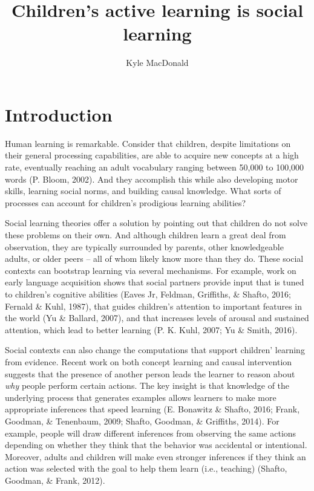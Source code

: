 \documentclass[a4paper,man,apacite,floatsintext]{apa6}
\date{}
\title{\textbf{Children's active learning is social learning}}
\author{Kyle MacDonald}
\affiliation{Department of Psychology, Stanford University}
\begin{document}
\maketitle

\section{Introduction}\label{introduction}

Human learning is remarkable. Consider that children, despite
limitations on their general processing capabilities, are able to
acquire new concepts at a high rate, eventually reaching an adult
vocabulary ranging between 50,000 to 100,000 words (P. Bloom, 2002). And
they accomplish this while also developing motor skills, learning social
norms, and building causal knowledge. What sorts of processes can
account for children's prodigious learning abilities?

Social learning theories offer a solution by pointing out that children
do not solve these problems on their own. And although children learn a
great deal from observation, they are typically surrounded by parents,
other knowledgeable adults, or older peers -- all of whom likely know
more than they do. These social contexts can bootstrap learning via
several mechanisms. For example, work on early language acquisition
shows that social partners provide input that is tuned to children's
cognitive abilities (Eaves Jr, Feldman, Griffiths, \& Shafto, 2016;
Fernald \& Kuhl, 1987), that guides children's attention to important
features in the world (Yu \& Ballard, 2007), and that increases levels
of arousal and sustained attention, which lead to better learning (P. K.
Kuhl, 2007; Yu \& Smith, 2016).

Social contexts can also change the computations that support children'
learning from evidence. Recent work on both concept learning and causal
intervention suggests that the presence of another person leads the
learner to reason about \emph{why} people perform certain actions. The
key insight is that knowledge of the underlying process that generates
examples allows learners to make more appropriate inferences that speed
learning (E. Bonawitz \& Shafto, 2016; Frank, Goodman, \& Tenenbaum,
2009; Shafto, Goodman, \& Griffiths, 2014). For example, people will
draw different inferences from observing the same actions depending on
whether they think that the behavior was accidental or intentional.
Moreover, adults and children will make even stronger inferences if they
think an action was selected with the goal to help them learn (i.e.,
teaching) (Shafto, Goodman, \& Frank, 2012).
\end{document}
